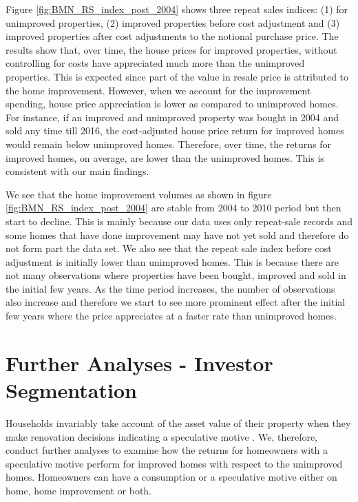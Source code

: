 \documentclass[AEJ,reqno, draftmode]{AEA} %
\begin{document}
%
Figure \ref{fig:BMN_RS_index_post_2004} shows three repeat sales indices: (1) for unimproved properties, (2) improved properties before cost adjustment and (3) improved properties after cost adjustments to the notional purchase price. The results show that, over time, the house prices for improved properties, without controlling for costs have appreciated much more than the unimproved properties. This is expected since part of the value in resale price is attributed to the home improvement. However, when we account for the improvement spending, house price appreciation is lower as compared to unimproved homes. For instance, if an improved and unimproved property was bought in 2004 and sold any time till 2016, the cost-adjusted house price return for improved homes would remain below unimproved homes. Therefore, over time, the returns for improved homes, on average, are lower than the unimproved homes. This is consistent with our main findings. 

We see that the home improvement volumes as shown in figure \ref{fig:BMN_RS_index_post_2004} are stable from 2004 to 2010 period but then start to decline. This is mainly because our data uses only repeat-sale records and some homes that have done improvement may have not yet sold and therefore do not form part the data set. We also see that the repeat sale index before cost adjustment is initially lower than unimproved homes. This is because there are not many observations where properties have been bought, improved and sold in the initial few years. As the time period increases, the number of observations also increase and therefore we start to see more prominent effect after the initial few years where the price appreciates at a faster rate than unimproved homes.


\section{Further Analyses - Investor Segmentation}

Households invariably take account of the asset value of their property when they make renovation decisions indicating a speculative motive \citep{helms2003understanding}. We, therefore, conduct further analyses to examine how the returns for homeowners with a speculative motive perform for improved homes with respect to the unimproved homes. Homeowners can have a consumption or a speculative motive either on home, home improvement or both. 
\end{document}
